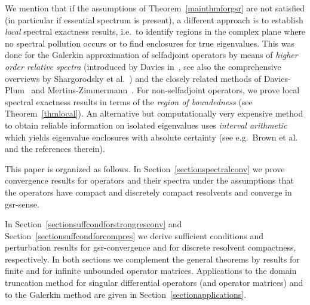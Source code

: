 \documentclass[a4paper,reqno]{amsart}
\begin{document}
{We mention that if the assumptions of Theorem~\ref{mainthmforgsr} are not satisfied (in particular if essential spectrum is present), a different approach is to establish \emph{local} spectral exactness results, 
i.e.\ to identify regions in the complex plane where no spectral pollution occurs or to find enclosures for true eigenvalues.
This was done for the Galerkin approximation of selfadjoint operators by means of 
{\emph{higher order relative spectra} (introduced by Davies in~\cite{davies_higher_order}, see also the  comprehensive overviews by Shargorodsky et al.\ \cite{shargorodsky-higher-order-relative-spectra,levitinshargorodsky})}
and the closely related methods of Davies-Plum~\cite{davies-plum-2004} and Mertins-Zimmermann~\cite{zimmermann-mertins}.
For non-selfadjoint operators, we prove local spectral exactness results in terms of the \emph{region of boundedness} (see Theorem~\ref{thmlocal}).
An alternative but computationally very expensive method 
to obtain reliable information on isolated eigenvalues uses \emph{interval arithmetic} which yields eigenvalue enclosures with absolute certainty (see e.g.\ Brown et al.\ \cite{blmtw2} and the references therein).

This paper is organized as follows.
In Section~\ref{sectionspectralconv} we prove convergence results for operators and their spectra
under the assumptions that the operators have compact and discretely compact resolvents and converge in gsr-sense.
 
In Section~\ref{sectionsuffcondforstrongresconv} and Section~\ref{sectionsuffcondforcompres} we derive sufficient conditions and perturbation results for gsr-convergence and for discrete resolvent compactness, respectively.
In both sections 
we complement the general theorems by results for finite and for infinite unbounded operator matrices.
Applications to the domain truncation method for singular differential operators (and operator matrices) and to the Galerkin method are given in Section~\ref{sectionapplications}.

}
\end{document}
